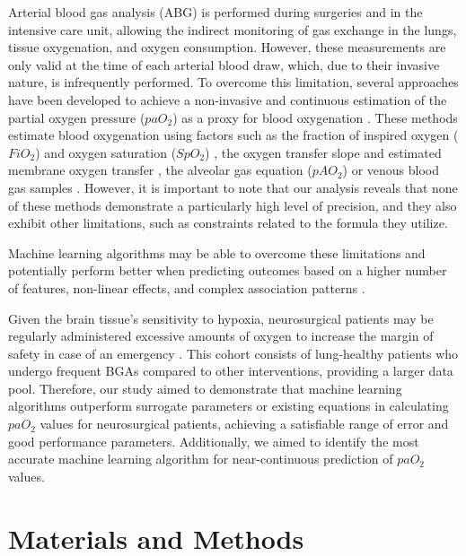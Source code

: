 \documentclass[referee,lineno,pdflatex,sn-nature]{sn-jnl}%
\theoremstyle{thmstyleone}%
\theoremstyle{thmstyletwo}%
\theoremstyle{thmstylethree}%
\begin{document}
Arterial blood gas analysis (ABG) is performed during surgeries and in the intensive care unit, allowing the indirect monitoring of gas exchange in the lungs, tissue oxygenation, and oxygen consumption. However, these measurements are only valid at the time of each arterial blood draw, which, due to their invasive nature, is infrequently performed. To overcome this limitation, several approaches have been developed to achieve a non-invasive and continuous estimation of the partial oxygen pressure ($paO_2$) as a proxy for blood oxygenation \cite{Brown2017,Bou-Khalil2017,Sanz2015,Fried1994,Sharma2019,BahmaniBohloli2018,Boulain2016}. These methods estimate blood oxygenation using factors such as the fraction of inspired oxygen ($FiO_2$) and oxygen saturation ($SpO_2$) \cite{Brown2017,Bou-Khalil2017,Sanz2015,Gross1981}, the oxygen transfer slope and estimated membrane oxygen transfer \cite{Fried1994}, the alveolar gas equation ($pAO_2$) \cite{Sharma2019} or venous blood gas samples \cite{BahmaniBohloli2018, Boulain2016, Tavakol2013, Raoufy2011}. However, it is important to note that our analysis reveals that none of these methods demonstrate a particularly high level of precision, and they also exhibit other limitations, such as constraints related to the formula they utilize.

Machine learning algorithms may be able to overcome these limitations and potentially perform better when predicting outcomes based on a higher number of features, non-linear effects, and complex association patterns \cite{Senders2018,Chae2020,Heo2019}. 

\label{objectives}Given the brain tissue's sensitivity to hypoxia, neurosurgical patients may be regularly administered excessive amounts of oxygen to increase the margin of safety in case of an emergency \cite{Weenink2020}. This cohort consists of lung-healthy patients who undergo frequent BGAs compared to other interventions, providing a larger data pool. Therefore, our study aimed to demonstrate that machine learning algorithms outperform surrogate parameters or existing equations in calculating $paO_2$ values for neurosurgical patients, achieving a satisfiable range of error and good performance parameters. Additionally, we aimed to identify the most accurate machine learning algorithm for near-continuous prediction of $paO_2$ values.

\section{Materials and Methods}\label{sec2}
\end{document}
